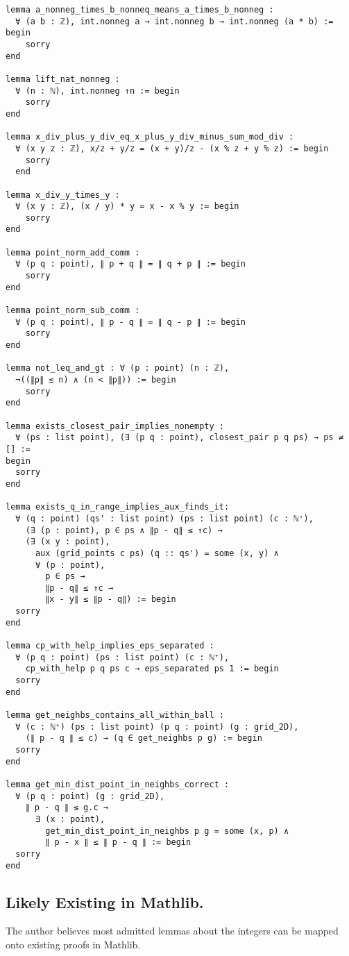 \documentclass{article}
\begin{document}
\newpage
\begin{verbatim}
lemma a_nonneg_times_b_nonneq_means_a_times_b_nonneg :
  ∀ (a b : ℤ), int.nonneg a → int.nonneg b → int.nonneg (a * b) := begin
    sorry
end

lemma lift_nat_nonneg :
  ∀ (n : ℕ), int.nonneg ↑n := begin
    sorry
end

lemma x_div_plus_y_div_eq_x_plus_y_div_minus_sum_mod_div :
  ∀ (x y z : ℤ), x/z + y/z = (x + y)/z - (x % z + y % z) := begin
    sorry
  end

lemma x_div_y_times_y :
  ∀ (x y : ℤ), (x / y) * y = x - x % y := begin
    sorry
end

lemma point_norm_add_comm :
  ∀ (p q : point), ∥ p + q ∥ = ∥ q + p ∥ := begin
    sorry
end

lemma point_norm_sub_comm :
  ∀ (p q : point), ∥ p - q ∥ = ∥ q - p ∥ := begin
    sorry
end

lemma not_leq_and_gt : ∀ (p : point) (n : ℤ),
  ¬((∥p∥ ≤ n) ∧ (n < ∥p∥)) := begin
    sorry
end

lemma exists_closest_pair_implies_nonempty :
  ∀ (ps : list point), (∃ (p q : point), closest_pair p q ps) → ps ≠ [] :=
begin
  sorry
end

lemma exists_q_in_range_implies_aux_finds_it:
  ∀ (q : point) (qs' : list point) (ps : list point) (c : ℕ⁺),
    (∃ (p : point), p ∈ ps ∧ ∥p - q∥ ≤ ↑c) →
    (∃ (x y : point),
      aux (grid_points c ps) (q :: qs') = some (x, y) ∧
      ∀ (p : point),
        p ∈ ps →
        ∥p - q∥ ≤ ↑c →
        ∥x - y∥ ≤ ∥p - q∥) := begin
  sorry
end

lemma cp_with_help_implies_eps_separated :
  ∀ (p q : point) (ps : list point) (c : ℕ⁺),
    cp_with_help p q ps c → eps_separated ps 1 := begin
  sorry
end

lemma get_neighbs_contains_all_within_ball :
  ∀ (c : ℕ⁺) (ps : list point) (p q : point) (g : grid_2D),
    (∥ p - q ∥ ≤ c) → (q ∈ get_neighbs p g) := begin
  sorry
end

lemma get_min_dist_point_in_neighbs_correct :
  ∀ (p q : point) (g : grid_2D),
    ∥ p - q ∥ ≤ g.c →
      ∃ (x : point),
        get_min_dist_point_in_neighbs p g = some (x, p) ∧
        ∥ p - x ∥ ≤ ∥ p - q ∥ := begin
  sorry
end
\end{verbatim}

\subsection{Likely Existing in Mathlib.}
The author believes most admitted lemmas about the integers can be mapped onto existing proofs in Mathlib.
\end{document}
